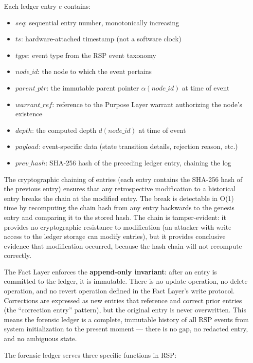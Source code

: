 Each ledger entry $e$ contains:
\begin{itemize}
    \item $seq$: sequential entry number, monotonically increasing
    \item $ts$: hardware-attached timestamp (not a software clock)
    \item $type$: event type from the RSP event taxonomy
    \item $node\_id$: the node to which the event pertains
    \item $parent\_ptr$: the immutable parent pointer $\alpha(node\_id)$ at time of event
    \item $warrant\_ref$: reference to the Purpose Layer warrant authorizing the node's existence
    \item $depth$: the computed depth $d(node\_id)$ at time of event
    \item $payload$: event-specific data (state transition details, rejection reason, etc.)
    \item $prev\_hash$: SHA-256 hash of the preceding ledger entry, chaining the log
\end{itemize}

The cryptographic chaining of entries (each entry contains the SHA-256 hash of the previous entry) ensures that any retrospective modification to a historical entry breaks the chain at the modified entry. The break is detectable in O(1) time by recomputing the chain hash from any entry backwards to the genesis entry and comparing it to the stored hash. The chain is tamper-evident: it provides no cryptographic resistance to modification (an attacker with write access to the ledger storage can modify entries), but it provides conclusive evidence that modification occurred, because the hash chain will not recompute correctly.

The Fact Layer enforces the \textbf{append-only invariant}: after an entry is committed to the ledger, it is immutable. There is no update operation, no delete operation, and no revert operation defined in the Fact Layer's write protocol. Corrections are expressed as new entries that reference and correct prior entries (the ``correction entry'' pattern), but the original entry is never overwritten. This means the forensic ledger is a complete, immutable history of all RSP events from system initialization to the present moment — there is no gap, no redacted entry, and no ambiguous state.

The forensic ledger serves three specific functions in RSP:

